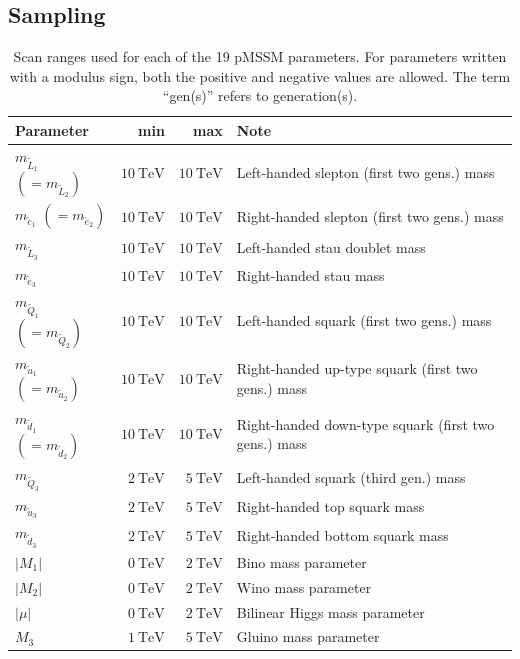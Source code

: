 \subsection{Sampling}

\begin{table}[h]
	\centering
	\small
	\caption{Scan ranges used for each of the 19 pMSSM parameters. For parameters written with a modulus sign, both the positive and negative values are allowed. The term ``gen(s)'' refers to generation(s).}
	\setlength\heavyrulewidth{0.2ex}
	\begin{tabular} {l r r l}
		\toprule
		Parameter & min & max & Note \\ 
		\midrule
		$m_{\tilde{L}_1}$ $(=m_{\tilde{L}_2})$ & $\SI{10}{\TeV}$ & $\SI{10}{\TeV}$ & Left-handed slepton (first two gens.) mass \\
		$m_{\tilde{e}_1}$ $(=m_{\tilde{e}_2})$ & $\SI{10}{\TeV}$ & $\SI{10}{\TeV}$ & Right-handed slepton (first two gens.) mass \\ 
		$m_{\tilde{L}_3}$ & $\SI{10}{\TeV}$ & $\SI{10}{\TeV}$ & Left-handed stau doublet mass \\
		$m_{\tilde{e}_3}$ & $\SI{10}{\TeV}$ & $\SI{10}{\TeV}$ & Right-handed stau mass \\
		\midrule
		$m_{\tilde{Q}_1}$ $(=m_{\tilde{Q}_2})$ & $\SI{10}{\TeV}$ & $\SI{10}{\TeV}$ & Left-handed squark (first two gens.) mass \\
		$m_{\tilde{u}_1}$ $(=m_{\tilde{u}_2})$ & $\SI{10}{\TeV}$ & $\SI{10}{\TeV}$ & Right-handed up-type squark (first two gens.) mass \\
		$m_{\tilde{d}_1}$ $(=m_{\tilde{d}_2})$ &$\SI{10}{\TeV}$ & $\SI{10}{\TeV}$ & Right-handed down-type squark (first two gens.) mass \\
		$m_{\tilde{Q}_3}$ & $\SI{2}{\TeV}$ & $\SI{5}{\TeV}$ & Left-handed squark (third gen.) mass \\
		$m_{\tilde{u}_3}$ & $\SI{2}{\TeV}$ & $\SI{5}{\TeV}$ & Right-handed top squark mass \\
		$m_{\tilde{d}_3}$ & $\SI{2}{\TeV}$ & $\SI{5}{\TeV}$ & Right-handed bottom squark mass \\
		\midrule
		$\vert M_1\vert$ & $\SI{0}{\TeV}$ & $\SI{2}{\TeV}$ & Bino mass parameter \\
		$\vert M_2\vert$ & $\SI{0}{\TeV}$ & $\SI{2}{\TeV}$ & Wino mass parameter \\
		$\vert\mu\vert$ & $\SI{0}{\TeV}$ & $\SI{2}{\TeV}$ & Bilinear Higgs mass parameter \\
		$M_3$ & $\SI{1}{\TeV}$ & $\SI{5}{\TeV}$ & Gluino mass parameter \\

\end{tabular}
\end{table}

